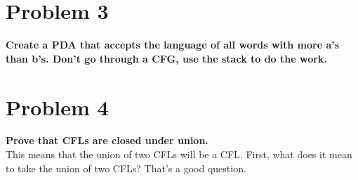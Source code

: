 \section*{Problem 3} \textbf{Create a PDA that accepts the language of all
  words with more a's than b's. Don't go through a CFG, use the stack to do the
  work.}

  \begin{figure}[H]
  \end{figure}


\newpage
\section*{Problem 4} \textbf{Prove that CFLs are closed under union.}\\
This means that the union of two CFLs will be a CFL\@.  First,
what does it mean to take the union of two CFLs\@?  That's 
a good question.

